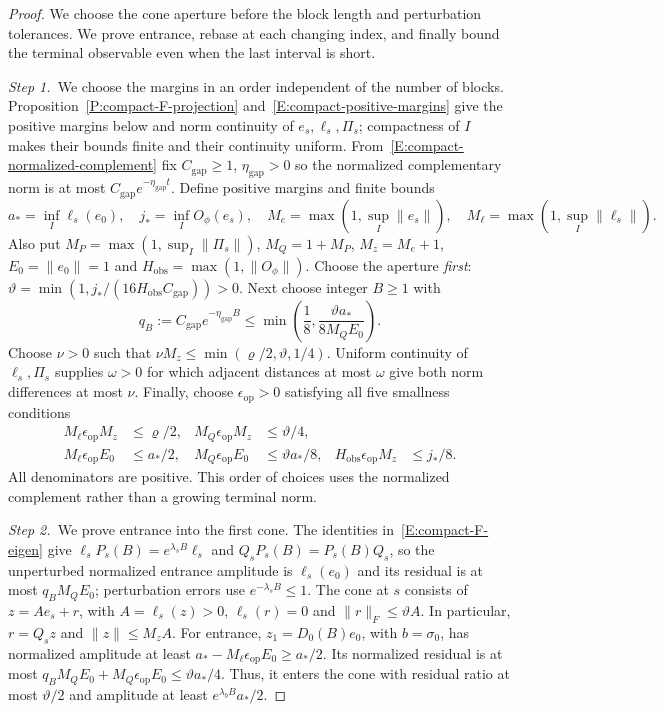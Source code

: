 \begin{proof}
  We choose the cone aperture before the block length and perturbation
  tolerances. We prove entrance, rebase at each changing index, and finally
  bound the terminal observable even when the last interval is short.


  \medskip
  \noindent\textit{Step 1.~}We choose the margins in an order independent of
  the number of blocks.
  Proposition~\ref{P:compact-F-projection}
  and~\eqref{E:compact-positive-margins} give the positive margins below and
  norm continuity of $e_s,\ell_s,\Pi_s$; compactness of $I$ makes their bounds
  finite and their continuity uniform.
  From~\eqref{E:compact-normalized-complement} fix $C_{\mathrm{gap}} \ge 1$,
  $\eta_{\mathrm{gap}} > 0$ so the normalized complementary norm is at most
  $C_{\mathrm{gap}}e^{-\eta_{\mathrm{gap}}t}$. Define positive margins and
  finite bounds
  \[
    a_*=\inf_I\ell_s(e_0),\quad j_*=\inf_I O_\phi(e_s),\quad
    M_e=\max(1,\sup_I\|e_s\|),\quad
    M_\ell=\max(1,\sup_I\|\ell_s\|).
  \]
  Also put $M_P = \max(1,\sup_I\|\Pi_s\|)$, $M_Q = 1+M_P$, $M_z = M_e+1$, $E_0 =
  \|e_0\| = 1$ and $H_{\mathrm{obs}} = \max(1,\|O_\phi\|)$. Choose the aperture
  \emph{first}: $\vartheta = \min(1,j_*/(16H_{\mathrm{obs}}C_{\mathrm{gap}})) >
  0$. Next choose integer $B \ge 1$ with
  \[
    q_B:=C_{\mathrm{gap}}e^{-\eta_{\mathrm{gap}}B}
    \le\min\left(\frac18,\frac{\vartheta a_*}{8M_QE_0}\right).
  \]
  Choose $\nu > 0$ such that $\nu M_z \le \min(\varrho/2,\vartheta,1/4)$.
  Uniform continuity of $\ell_s,\Pi_s$ supplies $\omega > 0$ for which adjacent
  distances at most $\omega$ give both norm differences at most $\nu$. Finally,
  choose $\epsilon_{\mathrm{op}} > 0$ satisfying all five smallness conditions
  \begin{align*}
    M_\ell\epsilon_{\mathrm{op}}M_z&\le\varrho/2,&
    M_Q\epsilon_{\mathrm{op}}M_z&\le\vartheta/4,\\
    M_\ell\epsilon_{\mathrm{op}}E_0&\le a_*/2,&
    M_Q\epsilon_{\mathrm{op}}E_0&\le\vartheta a_*/8,&
    H_{\mathrm{obs}}\epsilon_{\mathrm{op}}M_z&\le j_*/8.
  \end{align*}
  All denominators are positive. This order of choices uses the normalized
  complement rather than a growing terminal norm.


  \medskip
  \noindent\textit{Step 2.~}We prove entrance into the first cone.
  The identities in~\eqref{E:compact-F-eigen} give
  $\ell_sP_s(B)=e^{\lambda_sB}\ell_s$ and $Q_sP_s(B)=P_s(B)Q_s$, so the
  unperturbed normalized entrance amplitude is $\ell_s(e_0)$ and its residual
  is at most $q_BM_QE_0$; perturbation errors use $e^{-\lambda_sB}\le1$.
  The cone at $s$ consists of $z = Ae_s+r$, with $A = \ell_s(z) > 0$, $\ell_s(r)
  = 0$ and $\|r\|_F \le \vartheta A$. In particular, $r = Q_sz$ and $\|z\| \le
  M_zA$. For entrance, $z_1 = D_0(B)e_0$, with $b = \sigma_0$, has normalized
  amplitude at least $a_*-M_\ell\epsilon_{\mathrm{op}}E_0 \ge a_*/2$. Its
  normalized residual is at most $q_BM_QE_0+M_Q\epsilon_{\mathrm{op}}E_0 \le
  \vartheta a_*/4$. Thus, it enters the cone with residual ratio at most
  $\vartheta/2$ and amplitude at least $e^{\lambda_bB}a_*/2$.



\end{proof}
